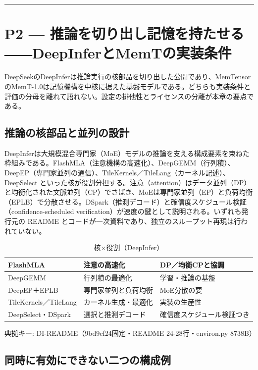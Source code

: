 \documentclass[lualatex,a4paper,10pt]{jlreq}
\begin{document}
\bigskip\hrule\bigskip


\section{P2 --- 推論を切り出し記憶を持たせる――DeepInferとMemTの実装条件}
\label{sec:P2}


DeepSeekのDeepInferは推論実行の核部品を切り出した公開であり、MemTensorのMemT-1.0は記憶機構を中核に据えた基盤モデルである。どちらも実装条件と評価の分母を離れて語れない。設定の排他性とライセンスの分離が本章の要点である。


\subsection*{推論の核部品と並列の設計}


DeepInferは大規模混合専門家（MoE）モデルの推論を支える構成要素を束ねた枠組みである。FlashMLA（注意機構の高速化）、DeepGEMM（行列積）、DeepEP（専門家並列の通信）、TileKernels／TileLang（カーネル記述）、DeepSelect といった核が役割分担する。注意（attention）はデータ並列（DP）と均衡化された文脈並列（CP）でさばき、MoEは専門家並列（EP）と負荷均衡（EPLB）で分散させる。DSpark（推測デコード）と確信度スケジュール検証（confidence-scheduled verification）が速度の鍵として説明される。いずれも発行元の README とコードが一次資料であり、独立のスループット再現は行われていない。


\begin{table}[htbp]\centering\footnotesize
\caption{核×役割（DeepInfer）}
\begin{tabularx}{0.96\linewidth}{@{}lXX@{}}
\toprule
FlashMLA & 注意の高速化 & DP／均衡CPと協調 \\
\midrule
DeepGEMM & 行列積の最適化 & 学習・推論の基盤 \\
DeepEP＋EPLB & 専門家並列と負荷均衡 & MoE分散の要 \\
TileKernels／TileLang & カーネル生成・最適化 & 実装の生産性 \\
DeepSelect・DSpark & 選択と推測デコード & 確信度スケジュール検証つき \\
\bottomrule
\end{tabularx}
{\scriptsize\color{SurveyMuted} 典拠キー: DI-README（9bd9cf24固定・README 24-28行・environ.py 8738B）\par}
\end{table}


\subsection*{同時に有効にできない二つの構成例}
\end{document}
